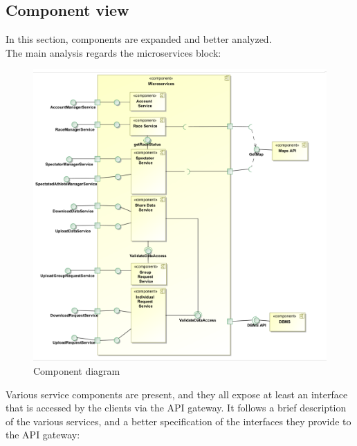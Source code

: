 \subsection{Component view}
In this section, components are expanded and better analyzed. \\
The main analysis regards the microservices block: 
\begin{figure}[H]
\includegraphics[width=\linewidth]{Images/componentdiagram.pdf}
\caption{ Component diagram }
\label{fig:world2}
\end{figure}
Various service components are present, and they all expose at least an interface that is accessed by the
clients via the API gateway. It follows a brief description of the various services, and a better
specification of the interfaces they provide to the API gateway:
